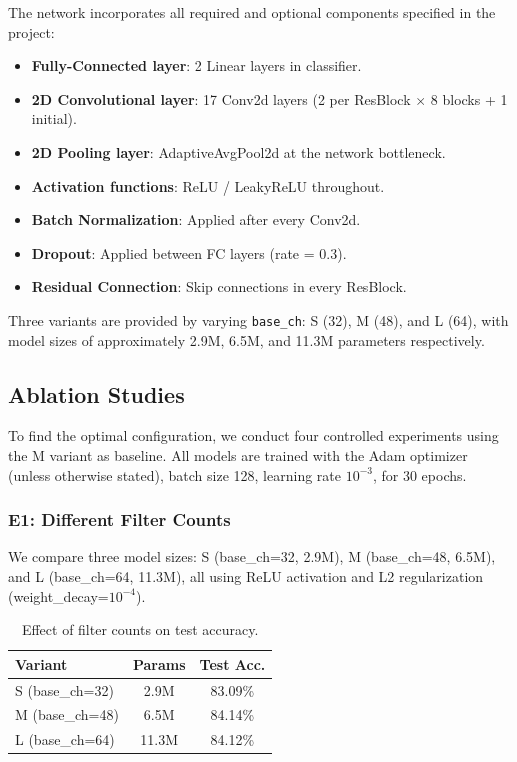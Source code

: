 \documentclass[11pt,a4paper]{article}
\begin{document}
The network incorporates all required and optional components specified in the project:
\begin{itemize}
    \item \textbf{Fully-Connected layer}: 2 Linear layers in classifier.
    \item \textbf{2D Convolutional layer}: 17 Conv2d layers (2 per ResBlock $\times$ 8 blocks + 1 initial).
    \item \textbf{2D Pooling layer}: AdaptiveAvgPool2d at the network bottleneck.
    \item \textbf{Activation functions}: ReLU / LeakyReLU throughout.
    \item \textbf{Batch Normalization}: Applied after every Conv2d.
    \item \textbf{Dropout}: Applied between FC layers (rate = 0.3).
    \item \textbf{Residual Connection}: Skip connections in every ResBlock.
\end{itemize}

Three variants are provided by varying \texttt{base\_ch}: S (32), M (48), and L (64), with model sizes of approximately 2.9M, 6.5M, and 11.3M parameters respectively.

\subsection{Ablation Studies}

To find the optimal configuration, we conduct four controlled experiments using the M variant as baseline. All models are trained with the Adam optimizer (unless otherwise stated), batch size 128, learning rate $10^{-3}$, for 30 epochs.

\subsubsection{E1: Different Filter Counts}

We compare three model sizes: S (base\_ch=32, 2.9M), M (base\_ch=48, 6.5M), and L (base\_ch=64, 11.3M), all using ReLU activation and L2 regularization (weight\_decay=$10^{-4}$).

\begin{table}[H]
\centering
\caption{Effect of filter counts on test accuracy.}
\begin{tabular}{lcc}
\toprule
\textbf{Variant} & \textbf{Params} & \textbf{Test Acc.} \\
\midrule
S (base\_ch=32)  & 2.9M  & 83.09\% \\
M (base\_ch=48)  & 6.5M  & 84.14\% \\
L (base\_ch=64)  & 11.3M & 84.12\% \\
\bottomrule
\end{tabular}
\end{table}
\end{document}
